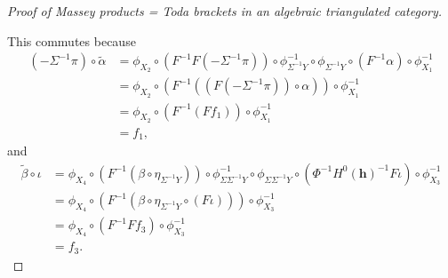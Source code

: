 \begin{proof}[Proof of Massey products = Toda brackets in an algebraic triangulated category]
\begin{center}
    \end{center}
    This commutes because
    \begin{align*}
        (- \Sigma^{-1} \pi) \circ \tilde{\alpha} &= \phi_{X_2} \circ (F^{-1} F (- \Sigma^{-1} \pi)) \circ \phi^{-1}_{\Sigma^{-1} Y} \circ \phi_{\Sigma^{-1} Y} \circ (F^{-1} \alpha) \circ \phi^{-1}_{X_1}\\
        &= \phi_{X_2} \circ (
            F^{-1} (
                (F (- \Sigma^{-1} \pi)) \circ \alpha
                )
            ) \circ \phi^{-1}_{X_1} \\
        &= \phi_{X_2} \circ (F^{-1} (F f_1)) \circ \phi^{-1}_{X_1} \\
        &= f_1,
    \end{align*}
    and
    \begin{align*}
        \tilde{\beta} \circ \iota &= \phi_{X_4} \circ (F^{-1} (\beta \circ \eta_{\Sigma^{-1} Y})) \circ \phi^{-1}_{\Sigma \Sigma^{-1} Y} \circ \phi_{\Sigma \Sigma^{-1} Y} \circ (\Phi^{-1} H^0(\mathbf{h})^{-1} F \iota) \circ \phi^{-1}_{X_3} \\
        &= \phi_{X_4} \circ (F^{-1}(\beta \circ \eta_{\Sigma^{-1} Y} \circ (F \iota))) \circ \phi^{-1}_{X_3} \\
        &= \phi_{X_4} \circ (F^{-1} F f_3) \circ \phi^{-1}_{X_3} \\
        &= f_3.
    \end{align*}


\end{proof}
